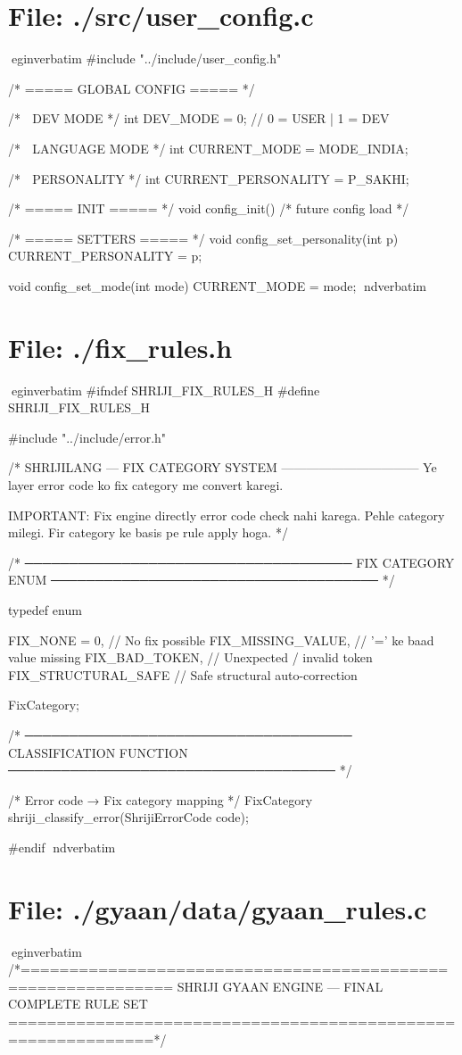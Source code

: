 \documentclass{article}
\begin{document}
\section*{File: ./src/user_config.c}
egin{verbatim}
#include "../include/user_config.h"

/* ===== GLOBAL CONFIG ===== */

/* 🌸 DEV MODE */
int DEV_MODE = 0;  // 0 = USER | 1 = DEV

/* 🌸 LANGUAGE MODE */
int CURRENT_MODE = MODE_INDIA;

/* 🌸 PERSONALITY */
int CURRENT_PERSONALITY = P_SAKHI;

/* ===== INIT ===== */
void config_init()
{
    /* future config load */
}

/* ===== SETTERS ===== */
void config_set_personality(int p)
{
    CURRENT_PERSONALITY = p;
}

void config_set_mode(int mode)
{
    CURRENT_MODE = mode;
}
nd{verbatim}
\section*{File: ./fix_rules.h}
egin{verbatim}
#ifndef SHRIJI_FIX_RULES_H
#define SHRIJI_FIX_RULES_H

#include "../include/error.h"

/*
    SHRIJILANG — FIX CATEGORY SYSTEM
    ---------------------------------
    Ye layer error code ko fix category me convert karegi.

    IMPORTANT:
    Fix engine directly error code check nahi karega.
    Pehle category milegi.
    Fir category ke basis pe rule apply hoga.
*/

/* ─────────────────────────────────────
   FIX CATEGORY ENUM
───────────────────────────────────── */

typedef enum {

    FIX_NONE = 0,              // No fix possible
    FIX_MISSING_VALUE,         // '=' ke baad value missing
    FIX_BAD_TOKEN,             // Unexpected / invalid token
    FIX_STRUCTURAL_SAFE        // Safe structural auto-correction

} FixCategory;


/* ─────────────────────────────────────
   CLASSIFICATION FUNCTION
───────────────────────────────────── */

/*
    Error code → Fix category mapping
*/
FixCategory shriji_classify_error(ShrijiErrorCode code);


#endif
nd{verbatim}
\section*{File: ./gyaan/data/gyaan_rules.c}
egin{verbatim}
/*=============================================================
  SHRIJI GYAAN ENGINE — FINAL COMPLETE RULE SET
=============================================================*/
\end{document}
